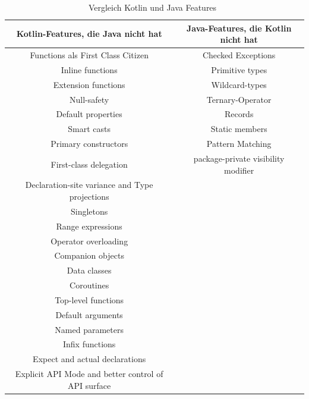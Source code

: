 \documentclass[11pt]{article}
\begin{document}
    \begin{table}[h!]
        \centering
        \begin{tabular}{|c|c|}
            \hline
            \textbf{Kotlin-Features, die Java nicht hat} & \textbf{Java-Features, die Kotlin nicht hat} \\
            \hline
            \hline
            Functions als First Class Citizen & Checked Exceptions \\
            \hline
            Inline functions & Primitive types \\
            \hline
            Extension functions & Wildcard-types \\
            \hline
            Null-safety & Ternary-Operator \\
            \hline
            Default properties & Records \\
            \hline
            Smart casts & Static members \\
            \hline
            Primary constructors & Pattern Matching \\
            \hline
            First-class delegation & package-private visibility modifier \\
            \hline
            Declaration-site variance and Type projections &  \\
            \hline
            Singletons &  \\
            \hline
            Range expressions &  \\
            \hline
            Operator overloading &  \\
            \hline
            Companion objects &  \\
            \hline
            Data classes &  \\
            \hline
            Coroutines &  \\
            \hline
            Top-level functions &  \\
            \hline
            Default arguments &  \\
            \hline
            Named parameters &  \\
            \hline
            Infix functions &  \\
            \hline
            Expect and actual declarations &  \\
            \hline
            Explicit API Mode and better control of API surface &  \\
            \hline
        \end{tabular}
        \caption{Vergleich Kotlin und Java Features~\cite{doc-comparison}}
        \label{tab:kotlin-java-features}
    \end{table}
\end{document}
